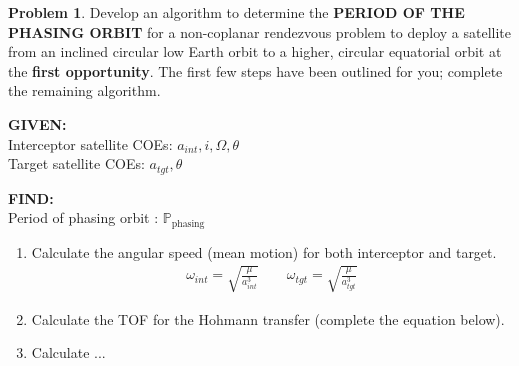 \documentclass[10pt]{article}
\theoremstyle{definition}
\newtheorem{prob}{Problem}[section]
\newcommand{\extrapage}{\clearpage\newpage\null\newpage}
\begin{document}
\begin{prob}
    Develop an algorithm to determine the \textbf{PERIOD OF THE PHASING ORBIT} for a non-coplanar rendezvous problem to deploy a satellite from an inclined circular low Earth orbit to a higher, circular equatorial orbit at the \textbf{first opportunity}.
    The first  few steps have been outlined for you; complete the remaining algorithm.

\noindent\textbf{GIVEN:} \\
        Interceptor satellite COEs: \( a_{int}, i, \Omega, \theta\)\\
        Target satellite COEs: \( a_{tgt}, \theta\)

\noindent\textbf{FIND:} \\
Period of phasing orbit : \( \mathbb{P}_{\text{phasing}}\)

\begin{enumerate}
\item Calculate the angular speed (mean motion) for both interceptor and target.
    \begin{align*}
        \omega_{int} = \sqrt{\frac{\mu}{a_{int}^3}} \qquad \omega_{tgt} = \sqrt{\frac{\mu}{a_{tgt}^3}}
    \end{align*}

\item Calculate the TOF for the Hohmann transfer (complete the equation below).
    \vspace*{2cm}
\item Calculate ...
\end{enumerate}
\end{prob}

\extrapage
\extrapage
\end{document}
